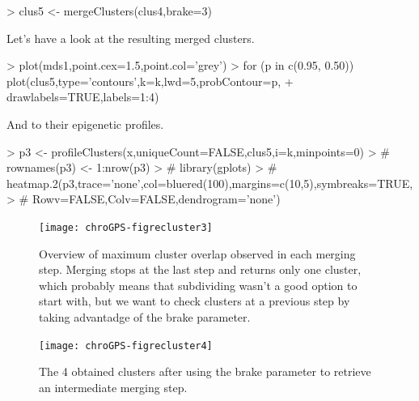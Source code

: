 \documentclass[a4paper,12pt,nogin]{article}
\begin{document}
\footnotesize

\begin{Schunk}
\begin{Sinput}
> clus5 <- mergeClusters(clus4,brake=3)
\end{Sinput}
\end{Schunk}

\normalsize

Let's have a look at the resulting merged clusters.

\footnotesize

\begin{Schunk}
\begin{Sinput}
> plot(mds1,point.cex=1.5,point.col='grey')
> for (p in c(0.95, 0.50)) plot(clus5,type='contours',k=k,lwd=5,probContour=p,
+ drawlabels=TRUE,labels=1:4)
\end{Sinput}
\end{Schunk}

\normalsize

And to their epigenetic profiles.

\footnotesize

\begin{Schunk}
\begin{Sinput}
> p3 <- profileClusters(x,uniqueCount=FALSE,clus5,i=k,minpoints=0)
> # rownames(p3) <- 1:nrow(p3)
> # library(gplots)
> # heatmap.2(p3,trace='none',col=bluered(100),margins=c(10,5),symbreaks=TRUE,
> # Rowv=FALSE,Colv=FALSE,dendrogram='none')
\end{Sinput}
\end{Schunk}

\normalsize

\begin{figure}
\begin{center}
\texttt{[image: chroGPS-figrecluster3]}
\end{center}
\caption{Overview of maximum cluster overlap observed in each merging step. Merging stops at the last step and returns only one cluster, which probably means that subdividing wasn't a good option to start with, but we want to check clusters at a previous step by taking advantadge of the brake parameter.}
\label{fig:recluster3}
\end{figure}

\normalsize

\begin{figure}
\begin{center}
\texttt{[image: chroGPS-figrecluster4]}
\end{center}
\caption{The 4 obtained clusters after using the brake parameter to retrieve an intermediate merging step.}
\label{fig:recluster4}
\end{figure}
\end{document}
